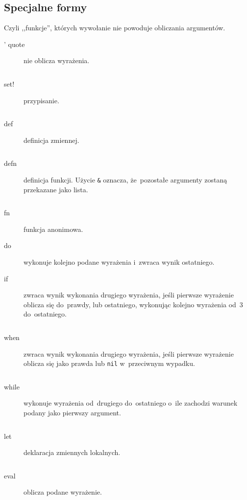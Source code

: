 \documentclass[a4paper,11pt]{article}
\newcommand{\clj}[1]{
\inputminted[fontsize=\footnotesize,frame=single,samepage=true]{clojure}{code/#1.clj}
}
\begin{document}
\subsection{Specjalne formy}

Czyli ,,funkcje'', których wywołanie nie powoduje obliczania argumentów.

\begin{description}
\item[' quote] nie oblicza wyrażenia.
  \clj{quote}

%
%

\item[set!] przypisanie.
  \clj{set!}

\item[def] definicja zmiennej.
  \clj{def}

\item[defn] definicja funkcji. Użycie \verb+&+ oznacza, że~pozostałe argumenty
  zostaną przekazane jako lista.
  \clj{defn}

\item[fn] funkcja anonimowa.

\item[do] wykonuje kolejno podane wyrażenia i~zwraca wynik ostatniego.

\item[if] zwraca wynik wykonania drugiego wyrażenia, jeśli pierwsze wyrażenie
  oblicza się do~prawdy, lub ostatniego, wykonując kolejno wyrażenia od~3
  do~ostatniego.
  \clj{if}

\item[when] zwraca wynik wykonania drugiego wyrażenia, jeśli pierwsze wyrażenie
  oblicza się jako prawda lub \verb+nil+ w~przeciwnym wypadku.
  \clj{when}

\item[while] wykonuje wyrażenia od~drugiego do~ostatniego o~ile zachodzi
  warunek podany jako pierwszy argument.
  \clj{while}

\item[let] deklaracja zmiennych lokalnych.
  \clj{let}

\item[eval] oblicza podane wyrażenie.
  \clj{eval}
\end{description}
\end{document}
